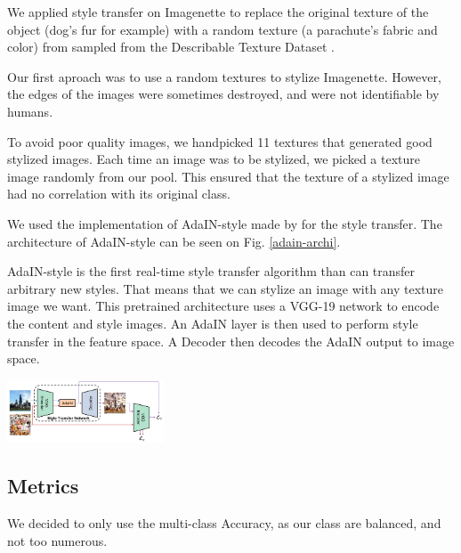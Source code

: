 \documentclass{article}
\begin{document}
\noindent
We applied style transfer on Imagenette to replace the original texture of the object (dog's fur for example) 
with a random texture (a parachute's fabric and color) 
from sampled from the Describable Texture Dataset \cite{cimpoi14describing}. \medskip \par

\noindent
Our first aproach was to use a random textures to stylize Imagenette. However, 
the edges of the images were sometimes destroyed, and were not identifiable by humans. \medskip \par

\noindent
To avoid poor quality images, we handpicked 11 textures that generated good stylized images.
Each time an image was to be stylized, we picked a texture image randomly from our pool.
This ensured that the texture of a stylized image had no correlation with its original class. \medskip \par

\noindent
We used the implementation of AdaIN-style \cite{huang2017arbitrary} made by \cite{stylizeddatasets2019}
for the style transfer. The architecture of AdaIN-style can be seen on Fig. \ref{adain-archi}.
\medskip \par
\vspace{-0.2cm}
\noindent
AdaIN-style is the first real-time style transfer algorithm than can transfer arbitrary new styles.
That means that we can stylize an image with any texture image we want.
This pretrained architecture uses a VGG-19 network to encode the content and style images.
An AdaIN layer is then used to perform style transfer in the feature space.   
A Decoder then decodes the AdaIN output to image space.

\begin{center}
  \captionsetup{type=figure}
  \includegraphics[width=0.35\textwidth]{imgs/adain_architecture}
  \label{adain-archi}
\end{center}

\subsection{Metrics}

We decided to only use the multi-class Accuracy, as our class are balanced, and not too numerous. \medskip \par
\end{document}
